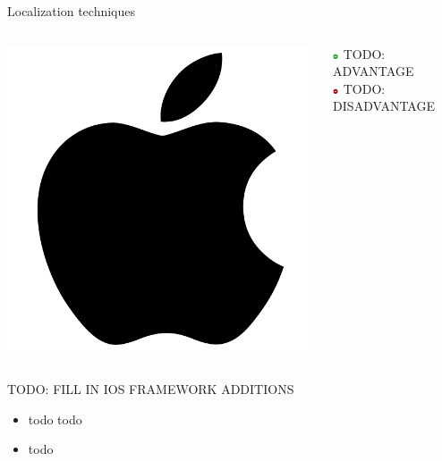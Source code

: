 \documentclass[11pt]{beamer}
\begin{document}
\begin{frame}{Localization techniques}

  \begin{columns}[c]

    \begin{column}{0.17\textwidth}
      \includegraphics[width=\textwidth]{apple}
    \end{column}

    \hfill

    \begin{column}{0.8\textwidth}

      \includegraphics[width=0.05\textwidth]{plus} TODO: ADVANTAGE\\
      \includegraphics[width=0.05\textwidth]{minus} TODO: DISADVANTAGE

    \end{column}

  \end{columns}

  TODO: FILL IN IOS FRAMEWORK ADDITIONS
  \begin{itemize}
    \setlength{\itemsep}{1pt}
    \setlength{\parskip}{0pt}
    \setlength{\parsep}{0pt}
    \item todo todo
    \item todo
  \end{itemize}

\end{frame}
\end{document}

